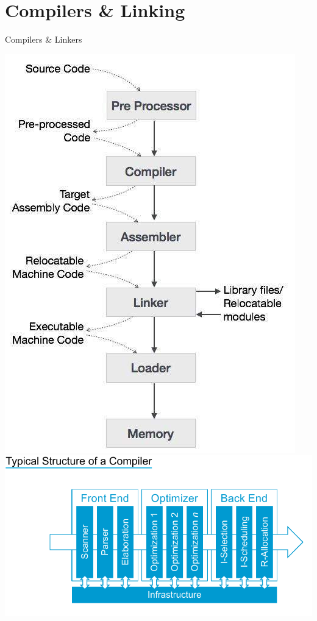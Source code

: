 \documentclass[10pt]{beamer}
\begin{document}
\section{Compilers \& Linking}
\begin{frame}[allowframebreaks]{Compilers \& Linkers}
 \begin{center}
        \includegraphics[keepaspectratio, width=\textwidth, height=\textheight-2\baselineskip-2\baselineskip]{img/210_compilation.jpg} \\ \framebreak
        \includegraphics[keepaspectratio, width=\textwidth, height=\textheight-2\baselineskip-2\baselineskip]{img/200_compiler_architecture_overview.png} \\ \framebreak

\end{center}
\end{frame}
\end{document}
